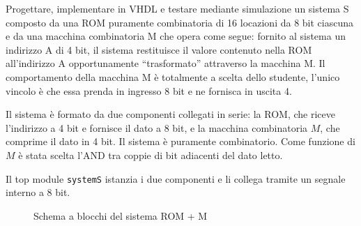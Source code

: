 \label{sec:esercizio2-1}

\begin{traccia}
Progettare, implementare in VHDL e testare mediante simulazione un sistema S composto da una ROM puramente combinatoria di 16 locazioni da 8 bit ciascuna e da una macchina combinatoria M che opera come segue: fornito al sistema un indirizzo A di 4 bit, il sistema restituisce il valore contenuto nella ROM all'indirizzo A opportunamente ``trasformato'' attraverso la macchina M. Il comportamento della macchina M è totalmente a scelta dello studente, l'unico vincolo è che essa prenda in ingresso 8 bit e ne fornisca in uscita 4.
\end{traccia}

\progetto

Il sistema è formato da due componenti collegati in serie: la ROM, che riceve l'indirizzo a 4 bit e fornisce il dato a 8 bit, e la macchina combinatoria $M$, che comprime il dato in 4 bit. Il sistema è puramente combinatorio. Come funzione di $M$ è stata scelta l'AND tra coppie di bit adiacenti del dato letto.

Il top module \texttt{systemS} istanzia i due componenti e li collega tramite un segnale interno a 8 bit.

\begin{figure}[H]
  \centering
  \caption{Schema a blocchi del sistema ROM + M}
  \label{fig:esercizio2-1:schema}
\end{figure}

